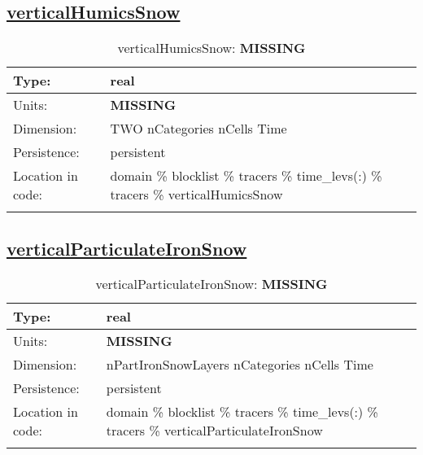\subsection[verticalHumicsSnow]{\hyperref[sec:var_tab_tracers]{verticalHumicsSnow}}
\label{subsec:var_sec_tracers_verticalHumicsSnow}
\begin{center}
\begin{longtable}{| p{2.0in} | p{4.0in} |}
        \hline 
        Type: & real \\
        \hline 
        Units: & {\bf \color{red} MISSING} \\
        \hline 
        Dimension: & TWO nCategories nCells Time \\
        \hline 
        Persistence: & persistent \\
        \hline 
         Location in code: & domain \% blocklist \% tracers \% time\_levs(:) \% tracers \% verticalHumicsSnow \\
         \hline 
    \caption{verticalHumicsSnow: {\bf \color{red} MISSING}}
\end{longtable}
\end{center}
\subsection[verticalParticulateIronSnow]{\hyperref[sec:var_tab_tracers]{verticalParticulateIronSnow}}
\label{subsec:var_sec_tracers_verticalParticulateIronSnow}
\begin{center}
\begin{longtable}{| p{2.0in} | p{4.0in} |}
        \hline 
        Type: & real \\
        \hline 
        Units: & {\bf \color{red} MISSING} \\
        \hline 
        Dimension: & nPartIronSnowLayers nCategories nCells Time \\
        \hline 
        Persistence: & persistent \\
        \hline 
         Location in code: & domain \% blocklist \% tracers \% time\_levs(:) \% tracers \% verticalParticulateIronSnow \\
         \hline 
    \caption{verticalParticulateIronSnow: {\bf \color{red} MISSING}}
\end{longtable}
\end{center}
